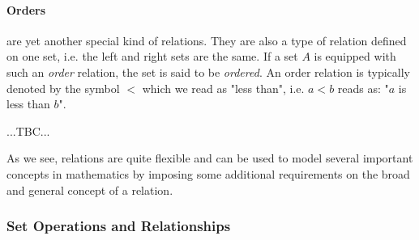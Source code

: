 


\paragraph{Orders} are yet another special kind of relations. They are also a type of relation defined on one set, i.e. the left and right sets are the same. If a set $A$ is equipped with such an \emph{order} relation, the set is said to be \emph{ordered}. An order relation is typically denoted by the symbol $<$ which we read as "less than", i.e. $a < b$ reads as: "$a$ is less than $b$".

...TBC...


\medskip
As we see, relations are quite flexible and can be used to model several important concepts in mathematics by imposing some additional requirements on the broad and general concept of a relation.

\subsubsection{Set Operations and Relationships}

